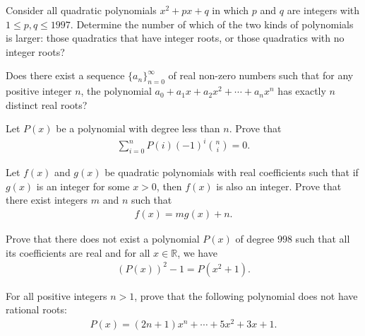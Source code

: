 \documentclass[12pt,a4paper]{memoir}
\theoremstyle{definition}
\begin{document}
\begin{question}[name={1997 Iran}]
	Consider all quadratic polynomials $x^2+px+q$ in which $p$ and $q$ are integers with $1 \leq p,q \leq 1997$. Determine the number of which of the two kinds of polynomials is larger: those quadratics that have integer roots, or those quadratics with no integer roots?
\end{question}




\begin{question}
	Does there exist a sequence $\{a_n\}_{n=0}^\infty$ of real non-zero numbers such that for any positive integer $n$, the polynomial $a_0+a_1x+a_2x^2+\cdots+a_nx^n$ has exactly $n$ distinct real roots?
\end{question}


\begin{question}[name={1999 Iran}]
	Let $P(x)$ be a polynomial with degree less than $n$. Prove that
	\begin{align*}
		\sum_{i=0}^n P(i)(-1)^i\binom{n}{i}=0.
	\end{align*}
\end{question}


\begin{question}[name={1996 Bulgaria}]
	Let $f(x)$ and $g(x)$ be quadratic polynomials with real coefficients such that if $g(x)$ is an integer for some $x>0$, then $f(x)$ is also an integer. Prove that there exist integers $m$ and $n$ such that
	\begin{align*}
		f(x)=mg(x)+n.
	\end{align*}
\end{question}




\begin{question}[name={1996 Austrian--Polish}]
	Prove that there does not exist a polynomial $P(x)$ of degree $998$ such that all its coefficients are real and for all $x\in\mathbb R$, we have
	\begin{align*}
		(P(x))^2-1 = P(x^2+1).
	\end{align*}
\end{question}

\begin{question}
	For all positive integers $n>1$, prove that the following polynomial does not have rational roots:
	\begin{align*}
		P(x)= (2n+1)x^n + \cdots + 5x^2 + 3x + 1.
	\end{align*}
\end{question}
\end{document}
